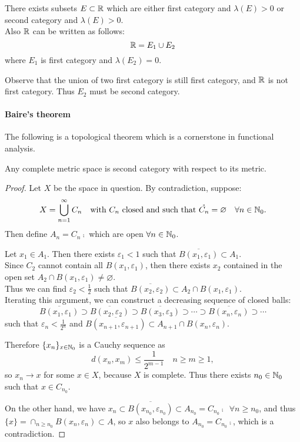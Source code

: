 \begin{prop}
	There exists subsets $E \subset \mathbb R$ which are either first category and $\lambda(E)>0$ or second category and $\lambda(E)>0$.\\
	Also $\mathbb R$ can be written as follows: $$\mathbb R=E_1 \cup E_2$$ where $E_1$ is first category and $\lambda(E_2)=0$. 
\end{prop}

Observe that the union of two first category is still first category, and $\mathbb R$ is not first category. Thus $E_2$ must be second category.

\paragraph{Baire's theorem} The following is a topological theorem which is a cornerstone in functional analysis.
\begin{theo}[Baire]
	Any complete metric space is second category with respect to its metric.
\end{theo}

\begin{proof}
	Let $X$ be the space in question. By contradiction, suppose:
	$$X=\bigcup_{n=1}^{\infty} C_n \quad \text{with } C_n \text{ closed and such that } \mathring{C_n}=\varnothing \quad \forall n \in \mathbb N_0.$$
	Then define $A_n = C_n\comp$ which are open $\forall n \in \mathbb N_0$.
	
	Let $x_1\in A_1$. Then there exists $\varepsilon_1 < 1$ such that $\overline{B(x_1, \varepsilon_1)} \subset A_1$.\\
	Since $C_2$ cannot contain all $B(x_1,\varepsilon_1)$, then there exists $x_2$ contained in the open set $A_2 \cap B(x_1,\varepsilon_1) \neq \varnothing$.\\
	Thus we can find $\varepsilon_2 < \frac 1 2$ such that $\overline{ B(x_2,\varepsilon_2)}\subset A_2 \cap B(x_1,\varepsilon_1)$.\\
	Iterating this argument, we can construct a decreasing sequence of closed balls:
	$$\overline{B(x_1,\varepsilon_1)} \supset \overline{B(x_2,\varepsilon_2)} \supset \overline{B(x_3,\varepsilon_3)} \supset  \cdots  \supset \overline{B(x_n,\varepsilon_n)} \supset  \cdots$$
	such that $\varepsilon_n < \frac{1}{2^n}$ and $\overline{B(x_{n+1},\varepsilon_{n+1})} \subset A_{n+1} \cap B(x_n, \varepsilon_n)$.
	
	Therefore $\{x_n\}_{x\in\mathbb N_0}$ is a Cauchy sequence as $$d(x_n, x_m) \leq \frac{1}{2^{m-1}} \quad n \geq m \geq 1,$$
	so $x_n \to x$ for some $x\in X$, because $X$ is complete. Thus there exists $n_0 \in \mathbb N_0$ such that $x\in C_{n_0}$.
	
	On the other hand,  we have $x_n \subset \overline{B(x_{n_0}, \varepsilon_{n_0})}\subset A_{n_0} =C_{n_0}\comp \enspace \forall n \geq n_0 $, and thus $\{x\}=\cap_{n\geq n_0} B(x_n, \varepsilon_n) \subset A$, so $x$ also belongs to $A_{n_0}= C_{n_0}\comp$, which is a contradiction.
\end{proof}

